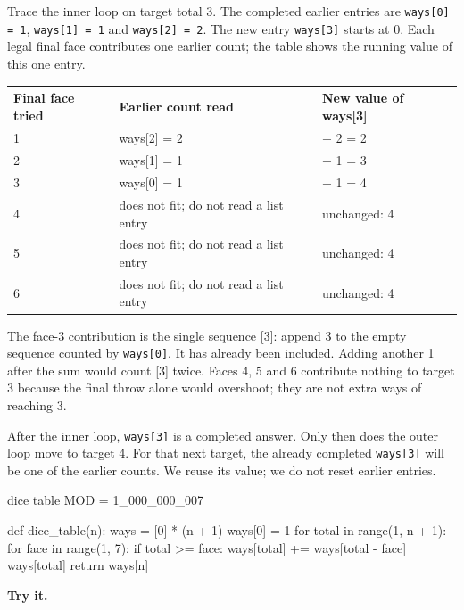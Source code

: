 \documentclass[11pt,a4paper,oneside]{report}
\begin{document}
Trace the inner loop on target total 3. The completed earlier entries are \texttt{ways[0] = 1}, \texttt{ways[1] = 1} and \texttt{ways[2] = 2}. The new entry \texttt{ways[3]} starts at 0. Each legal final face contributes one earlier count; the table shows the running value of this one entry.

\par\medskip\begingroup\small\setlength{\tabcolsep}{4pt}\renewcommand{\arraystretch}{1.3}\begin{tabularx}{\linewidth}{>{\raggedright\arraybackslash}X>{\raggedright\arraybackslash}X>{\raggedright\arraybackslash}X}\toprule\textbf{Final face tried} & \textbf{Earlier count read} & \textbf{New value of ways[3]}\\\midrule
{}1 & ways[2] = 2 & 0 + 2 = 2\\
{}2 & ways[1] = 1 & 2 + 1 = 3\\
{}3 & ways[0] = 1 & 3 + 1 = 4\\
{}4 & does not fit; do not read a list entry & unchanged: 4\\
{}5 & does not fit; do not read a list entry & unchanged: 4\\
{}6 & does not fit; do not read a list entry & unchanged: 4\\
\bottomrule\end{tabularx}\endgroup\par\medskip
The face-3 contribution is the single sequence [3]: append 3 to the empty sequence counted by \texttt{ways[0]}. It has already been included. Adding another 1 after the sum would count [3] twice. Faces 4, 5 and 6 contribute nothing to target 3 because the final throw alone would overshoot; they are not extra ways of reaching 3.

After the inner loop, \texttt{ways[3]} is a completed answer. Only then does the outer loop move to target 4. For that next target, the already completed \texttt{ways[3]} will be one of the earlier counts. We reuse its value; we do not reset earlier entries.

\begin{bookcode}{dice table}
MOD = 1_000_000_007

def dice_table(n):
    ways = [0] * (n + 1)
    ways[0] = 1
    for total in range(1, n + 1):
        for face in range(1, 7):
            if total >= face:
                ways[total] += ways[total - face]
        ways[total] %
    return ways[n]
\end{bookcode}
\textbf{Try it.}
\end{document}
